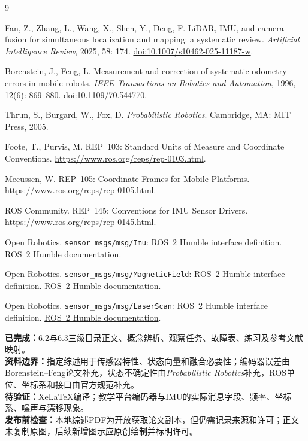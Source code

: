\documentclass[UTF8,zihao=-4]{ctexart}
\begin{document}
\begin{thebibliography}{9}

Fan, Z., Zhang, L., Wang, X., Shen, Y., Deng, F.
LiDAR, IMU, and camera fusion for simultaneous localization and mapping: a systematic review.
\emph{Artificial Intelligence Review}, 2025, 58: 174.
\href{https://doi.org/10.1007/s10462-025-11187-w}{doi:10.1007/s10462-025-11187-w}.

Borenstein, J., Feng, L.
Measurement and correction of systematic odometry errors in mobile robots.
\emph{IEEE Transactions on Robotics and Automation}, 1996, 12(6): 869--880.
\href{https://doi.org/10.1109/70.544770}{doi:10.1109/70.544770}.

Thrun, S., Burgard, W., Fox, D.
\emph{Probabilistic Robotics}.
Cambridge, MA: MIT Press, 2005.

Foote, T., Purvis, M.
REP~103: Standard Units of Measure and Coordinate Conventions.
\href{https://www.ros.org/reps/rep-0103.html}{https://www.ros.org/reps/rep-0103.html}.

Meeussen, W.
REP~105: Coordinate Frames for Mobile Platforms.
\href{https://www.ros.org/reps/rep-0105.html}{https://www.ros.org/reps/rep-0105.html}.

ROS Community.
REP~145: Conventions for IMU Sensor Drivers.
\href{https://www.ros.org/reps/rep-0145.html}{https://www.ros.org/reps/rep-0145.html}.

Open Robotics.
\texttt{sensor\_msgs/msg/Imu}: ROS~2 Humble interface definition.
\href{https://docs.ros.org/en/humble/p/sensor_msgs/msg/Imu.html}{ROS~2 Humble documentation}.

Open Robotics.
\texttt{sensor\_msgs/msg/MagneticField}: ROS~2 Humble interface definition.
\href{https://docs.ros.org/en/humble/p/sensor_msgs/msg/MagneticField.html}{ROS~2 Humble documentation}.

Open Robotics.
\texttt{sensor\_msgs/msg/LaserScan}: ROS~2 Humble interface definition.
\href{https://docs.ros.org/en/humble/p/sensor_msgs/msg/LaserScan.html}{ROS~2 Humble documentation}.

\end{thebibliography}

\noindent
\textbf{已完成：}6.2与6.3三级目录正文、概念辨析、观察任务、故障表、练习及参考文献映射。\\
\textbf{资料边界：}指定综述用于传感器特性、状态向量和融合必要性；编码器误差由Borenstein--Feng论文补充，状态不确定性由\emph{Probabilistic Robotics}补充，ROS单位、坐标系和接口由官方规范补充。\\
\textbf{待验证：}XeLaTeX编译；教学平台编码器与IMU的实际消息字段、频率、坐标系、噪声与漂移现象。\\
\textbf{发布前检查：}本地综述PDF为开放获取论文副本，但仍需记录来源和许可；正文未复制原图，后续新增图示应原创绘制并标明许可。
\end{document}
